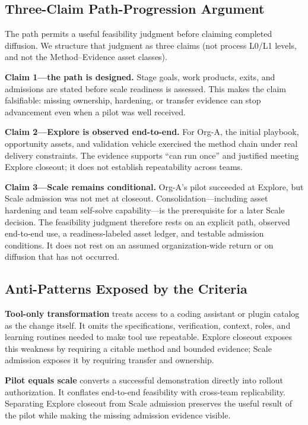\documentclass[10pt,conference]{IEEEtran}
\begin{document}
\subsection{Three-Claim Path-Progression Argument}

The path permits a useful feasibility judgment before claiming completed
diffusion.  We structure that judgment as three claims (not process L0/L1
levels, and not the Method--Evidence asset classes).

\textbf{Claim 1---the path is designed.}
Stage goals, work products, exits, and admissions are stated before scale readiness
is assessed.  This makes the claim falsifiable: missing ownership, hardening,
or transfer evidence can stop advancement even when a pilot was well
received.

\textbf{Claim 2---Explore is observed end-to-end.}
For Org-A, the initial playbook, opportunity assets, and validation vehicle
exercised the method chain under real delivery constraints.  The evidence
supports ``can run once'' and justified meeting Explore closeout; it does not establish
repeatability across teams.

\textbf{Claim 3---Scale remains conditional.}
Org-A's pilot succeeded at Explore, but Scale admission was not met at closeout.
Consolidation---including asset hardening and team self-solve
capability---is the prerequisite for a later Scale decision.  The feasibility
judgment therefore rests on an explicit path, observed end-to-end use, a
readiness-labeled asset ledger, and testable admission conditions.  It does
not rest on an assumed organization-wide return or on diffusion that has not
occurred.

\subsection{Anti-Patterns Exposed by the Criteria}

\textbf{Tool-only transformation} treats access to a coding assistant or
plugin catalog as the change itself.  It omits the specifications,
verification, context, roles, and learning routines needed to make tool use
repeatable.  Explore closeout exposes this weakness by requiring a citable method and
bounded evidence; Scale admission exposes it by requiring transfer and ownership.

\textbf{Pilot equals scale} converts a successful demonstration directly
into rollout authorization.  It conflates end-to-end feasibility with
cross-team replicability.  Separating Explore closeout from Scale admission preserves the useful result
of the pilot while making the missing admission evidence visible.
\end{document}
